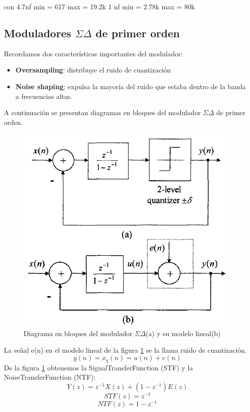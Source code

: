 \documentclass[assd_tp3_main.tex]{subfiles}
\begin{document}
con 4.7nf  
min = 617
max = 19.2k
1 nf 
min = 2.78k
max = 80k



\subsection{Moduladores $\Sigma\Delta$ de primer orden }
Recordamos dos características importantes del modulador:
\begin{itemize}
\item \textbf{Oversampling}: distribuye el ruido de cuantización 
\item \textbf{Noise shaping}: expulsa la mayoría del ruido que estaba dentro de la banda a frecuencias altas. 
\end{itemize}
A continuación se presentan diagramas en bloques del modulador $\Sigma\Delta$ de primer orden.
\begin{figure}[H]
\centering
\includegraphics[width=0.4\linewidth]{images/ej4/sd_linmodel.png}
\caption{Diagrama en bloques del modulador $\Sigma\Delta$(a) y su modelo lineal(b)}
\label{fig:sigmadelmod_model}
\end{figure}
La señal e(n) en el modelo lineal de la figura \ref{fig:sigmadelmod_model} se la llama ruido de cuantización.
\[ y(n)=x_q(n)= u(n)+e(n) \]
De la figura \ref{fig:sigmadelmod_model} obtenemos la SignalTransferFunction (STF) y la NoiseTransferFunction (NTF):
\[ Y(z)= z^{-1}X(z)+(1-z^{-1})E(z) \]
\[ STF(z)= z^{-1} \]
\[ NTF(z)= 1-z^{-1} \]
\end{document}
